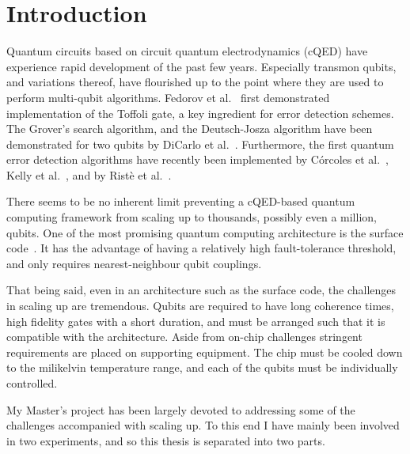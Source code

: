 \documentclass[12pt]{report}
\newcommand\blankpage{%
    \null
    \thispagestyle{empty}%
    \addtocounter{page}{-1}%
    \newpage}
\begin{document}
\blankpage
\tableofcontents
\newpage

\sectionfont{\scshape}



\chapter{Introduction}

  Quantum circuits based on circuit quantum electrodynamics (cQED) have experience rapid development of the past few years. Especially transmon qubits, and variations thereof, have flourished up to the point where they are used to perform multi-qubit algorithms. Fedorov et al.~\cite{fedorov2011implementation} first demonstrated implementation of the Toffoli gate, a key ingredient for error detection schemes. The Grover's search algorithm, and the Deutsch-Josza algorithm have been demonstrated for two qubits by DiCarlo et al.~\cite{dicarlo2009demonstration}. Furthermore, the first quantum error detection algorithms have recently been implemented by C\'orcoles et al.~\cite{corcoles2015demonstration}, Kelly et al.~\cite{kelly2015state}, and by Rist\`e et al.~\cite{riste2014detecting}.

  There seems to be no inherent limit preventing a cQED-based quantum computing framework from scaling up to thousands, possibly even a million, qubits. One of the most promising quantum computing architecture is the surface code~\cite{bravyi1998quantum}. It has the advantage of having a relatively high fault-tolerance threshold, and only requires nearest-neighbour qubit couplings.

  That being said, even in an architecture such as the surface code, the challenges in scaling up are tremendous. Qubits are required to have long coherence times, high fidelity gates with a short duration, and must be arranged such that it is compatible with the architecture. Aside from on-chip challenges stringent requirements are placed on supporting equipment. The chip must be cooled down to the milikelvin temperature range, and each of the qubits must be individually controlled.

  My Master's project has been largely devoted to addressing some of the challenges accompanied with scaling up. To this end I have mainly been involved in two experiments, and so this thesis is separated into two parts.
\end{document}
